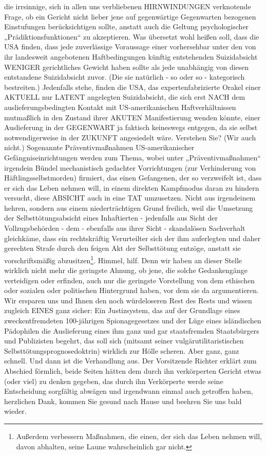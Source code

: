 \begin{multicols}{2}
{die irrsinnige, sich in allen uns verbliebenen HIRNWINDUNGEN verknotende Frage, ob ein Gericht nicht lieber
jene auf gegenwärtige Gegenwarten bezogenen Einstufungen berücksichtigen sollte, anstatt auch die Geltung
psychologischer „Prädiktionsfunktionen“ zu akzeptieren. Was übersetzt wohl heißen soll, dass die USA finden,
dass jede zuverlässige Voraussage einer vorhersehbar
unter den von ihr landesweit angebotenen Haftbedingungen künftig entstehenden Suizidabsicht WENIGER
gerichtliches Gewicht haben sollte als jede unabhängig
von diesen entstandene Suizidabsicht zuvor. (Die sie natürlich - so oder so - kategorisch bestreiten.) Jedenfalls
stehe, finden die USA, das expertenfabrizierte Orakel
einer AKTUELL nur LATENT angelegten Suizidabsicht,
die sich erst NACH dem auslieferungsbedingten Kontakt
mit US-amerikanischen Haftverhältnissen mutmaßlich
in den Zustand ihrer AKUTEN Manifestierung wenden
könnte, einer Auslieferung in der GEGENWART ja faktisch keineswegs entgegen, da sie selbst notwendigerweise in der ZUKUNFT angesiedelt wäre. Verstehen Sie?
(Wir auch nicht.)\textCR
Sogenannte Präventivmaßnahmen US-amerikanischer
Gefängniseinrichtungen werden zum Thema, wobei unter „Präventivmaßnahmen“ irgendein Bündel mechanistisch gedachter Vorrichtungen (zur Verhinderung von
Häftlingsselbstmorden) firmiert, das einen Gefangenen,
der so verzweifelt ist, dass er sich das Leben nehmen
will, in einem direkten Kampfmodus daran zu hindern
versucht, diese ABSICHT auch in eine TAT umzusetzen.
Nicht aus irgendeinem hehren, sondern aus einem niederträchtigen Grund freilich, weil die Umsetzung der
Selbsttötungsabsicht eines Inhaftierten - jedenfalls aus
Sicht der Vollzugsbehörden - dem - ebenfalls aus ihrer
Sicht - skandalösen Sachverhalt gleichkäme, dass ein
rechtskräftig Verurteilter sich der ihm auferlegten und
daher gerechten Strafe durch den feigen Akt der Selbsttötung entzöge, anstatt sie vorschriftsmäßig 
abzusitzen\footnote[21]{Außerdem verbessern Maßnahmen, die einen, der sich das Leben nehmen will, davon abhalten, seine Laune wahrscheinlich gar nicht.}.\textCR
Himmel, hilf. Denn wir haben an dieser Stelle wirklich
nicht mehr die geringste Ahnung, ob jene, die solche
Gedankengänge verteidigen oder erfinden, auch nur
die geringste Vorstellung von dem ethischen oder sozialen oder politischen Hintergrund haben, vor dem sie da
argumentieren. Wir ersparen uns und Ihnen den noch
würdeloseren Rest des Rests und wissen zugleich EINES
ganz sicher: Ein Justizsystem, das auf der Grundlage eines zweckentfremdeten 100-jährigen Spionagegesetzes
und der Lüge eines isländischen Pädophilen die Auslieferung eines ihm ganz und gar staatsfremden Staatsbürgers und Publizisten begehrt, das soll sich (mitsamt
seiner vulgärutilitaristischen Selbsttötungsprognosedoktrin) wirklich zur Hölle scheren. Aber ganz, ganz
schnell.\textCR
Und dann ist die Verhandlung aus. Der Vorsitzende Richter erklärt zum Abschied förmlich, beide Seiten hätten
dem durch ihn verkörperten Gericht etwas (oder viel) zu
denken gegeben, das durch ihn Verkörperte werde seine
Entscheidung sorgfältig abwägen und irgendwann einmal auch getroffen haben, herzlichen Dank, kommen
Sie gesund nach Hause und beehren Sie uns bald wieder.}



\end{multicols}
